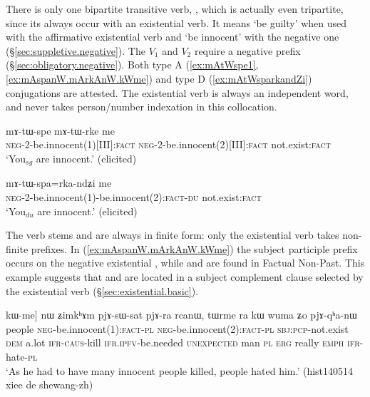 There is only one bipartite transitive verb, , which is actually even tripartite, since its always occur with an existential verb. It means `be guilty' when used with the affirmative existential verb  and  `be innocent' with the negative one  (§\ref{sec:suppletive.negative}). The $V_1$ and $V_2$ require a negative prefix (§\ref{sec:obligatory.negative}). Both type A (\ref{ex:mAtWspe1}, \ref{ex:mAspanW.mArkAnW.kWme}) and type D (\ref{ex:mAtWsparkandZi}) conjugations are attested. The existential verb is always an independent word, and never takes person/number indexation in this collocation. 

\begin{exe}
\ex \label{ex:mAtWspe1}
\gll  mɤ-tɯ-spe mɤ-tɯ-rke me \\
\textsc{neg}-2-be.innocent(1)[III]:\textsc{fact} \textsc{neg}-2-be.innocent(2)[III]:\textsc{fact} not.exist:\textsc{fact} \\
\glt `You$_{sg}$ are innocent.' (elicited)
\end{exe} 
 
\begin{exe}
\ex \label{ex:mAtWsparkandZi}
\gll  mɤ-tɯ-spa=rka-ndʑi me  \\
\textsc{neg}-2-be.innocent(1)-be.innocent(2):\textsc{fact}-\textsc{du} not.exist:\textsc{fact} \\
\glt `You$_{du}$ are innocent.' (elicited)
\end{exe} 

The verb stems  and  are always in finite form: only the existential verb takes non-finite prefixes. In (\ref{ex:mAspanW.mArkAnW.kWme}) the subject participle prefix  occurs on the negative existential , while   and  are found in Factual Non-Past. This example suggests that   and  are located in a subject complement clause selected by the existential verb (§\ref{sec:existential.basic}).

  \begin{exe}
\ex \label{ex:mAspanW.mArkAnW.kWme}
\gll [mkʰɤrmaŋ [mɤ-spa-nɯ mɤ-rka-nɯ] kɯ-me] nɯ ʑimkʰɤm pjɤ-sɯ-sat pjɤ-ra rcanɯ, tɯrme ra kɯ wuma ʑo pjɤ-qʰa-nɯ  \\
people \textsc{neg}-be.innocent(1):\textsc{fact}-\textsc{pl} \textsc{neg}-be.innocent(2):\textsc{fact}-\textsc{pl} \textsc{sbj}:\textsc{pcp}-not.exist \textsc{dem} a.lot \textsc{ifr}-\textsc{caus}-kill \textsc{ifr}.\textsc{ipfv}-be.needed \textsc{unexpected} man \textsc{pl} \textsc{erg} really \textsc{emph} \textsc{ifr}-hate-\textsc{pl} \\
 \glt `As he had to have many innocent people killed, people hated him.' (hist140514 xiee de shewang-zh)
\end{exe} 
  
